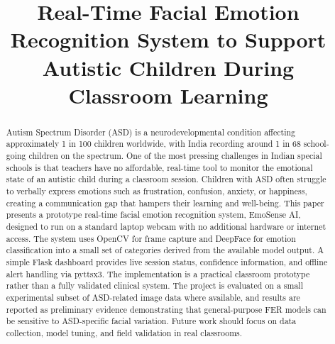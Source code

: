 \documentclass[conference]{IEEEtran}
\begin{document}
\title{Real-Time Facial Emotion Recognition System to Support
Autistic Children During Classroom Learning}

\author{
  \and
}

\maketitle

\begin{abstract}
Autism Spectrum Disorder (ASD) is a neurodevelopmental condition
affecting approximately 1 in 100 children worldwide, with India
recording around 1 in 68 school-going children on the spectrum.
One of the most pressing challenges in Indian special schools is
that teachers have no affordable, real-time tool to monitor the
emotional state of an autistic child during a classroom session.
Children with ASD often struggle to verbally express emotions
such as frustration, confusion, anxiety, or happiness, creating
a communication gap that hampers their learning and well-being.
This paper presents a prototype real-time facial emotion
recognition system, EmoSense AI, designed to run on a standard
laptop webcam with no additional hardware or internet access.
The system uses OpenCV for frame capture and DeepFace for
emotion classification into a small set of categories derived
from the available model output. A simple Flask dashboard
provides live session status, confidence information, and
offline alert handling via pyttsx3. The implementation is a
practical classroom prototype rather than a fully validated
clinical system. The project is evaluated on a small
experimental subset of ASD-related image data where available,
and results are reported as preliminary evidence demonstrating
that general-purpose FER models can be sensitive to ASD-specific
facial variation. Future work should focus on data collection,
model tuning, and field validation in real classrooms.
\end{abstract}
\end{document}
